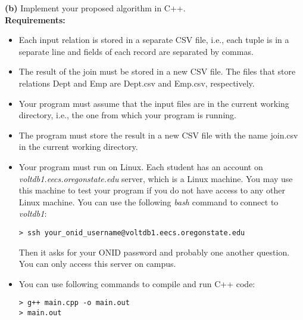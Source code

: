 \documentclass[11pt]{article}
\renewcommand\part[1]{\vspace{.10in}\textbf{(#1)}}
\begin{document}
\part{b}
Implement your proposed algorithm in C++.\\
\textbf{Requirements:}
\begin{itemize}
\item Each input relation is stored in a separate CSV file, i.e., each tuple is in a separate line and fields of each record are separated by commas.
\item The result of the join must be stored in a new CSV file.
The files that store relations Dept and Emp are Dept.csv and Emp.csv, respectively. 
\item Your program must assume that the input files are in the current working directory, i.e., the one from which your program is running.
\item The program must store the result in a new CSV file with the name join.csv in the current working directory.
\item Your program must run on Linux. Each student has an account on 
\textit{voltdb1.eecs.oregonstate.edu} server, which is a Linux machine. You may use this machine to test your program if you do not have access to any other Linux machine. You can use the following \textit{bash} command to connect to \textit{voltdb1}:
\begin{verbatim}
> ssh your_onid_username@voltdb1.eecs.oregonstate.edu
\end{verbatim}
Then it asks for your ONID password and probably one another question. You can only access this server on campus.

\item You can use following commands to compile and run C++ code:

\begin{verbatim}
> g++ main.cpp -o main.out
> main.out
\end{verbatim}

\end{itemize}
\end{document}
